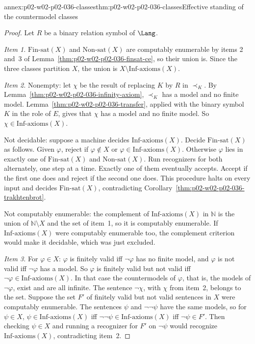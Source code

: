 \begin{annexitem}{annex:p02-w02-p02-036-classes}{thm:p02-w02-p02-036-classes}{Effective standing of the countermodel classes}
\begin{proof}
Let \(R\) be a binary relation symbol of \(\Lang\).

\emph{Item 1.}  \(\mathrm{Fin\text{-}sat}(X)\) and
\(\mathrm{Non\text{-}sat}(X)\) are computably enumerable by items 2 and~3 of
Lemma~\ref{thm:p02-w02-p02-036-finsat-ce}, so their union is.  Since the three
classes partition \(X\), the union is \(X\setminus\mathrm{Inf\text{-}axioms}(X)\).

\emph{Item 2.}  Nonempty: let \(\chi\) be the result of replacing \(K\) by
\(R\) in \(\prec_K\).  By Lemma~\ref{thm:p02-w02-p02-036-infinity-axiom},
\(\prec_K\) has a model and no finite model.  Lemma~\ref{thm:p02-w02-p02-036-transfer},
applied with the binary symbol \(K\) in the role of \(E\), gives that \(\chi\)
has a model and no finite model.  So \(\chi\in\mathrm{Inf\text{-}axioms}(X)\).

Not decidable: suppose a machine decides \(\mathrm{Inf\text{-}axioms}(X)\).
Decide \(\mathrm{Fin\text{-}sat}(X)\) as follows.  Given \(\varphi\), reject if
\(\varphi\notin X\) or \(\varphi\in\mathrm{Inf\text{-}axioms}(X)\).  Otherwise
\(\varphi\) lies in exactly one of \(\mathrm{Fin\text{-}sat}(X)\) and
\(\mathrm{Non\text{-}sat}(X)\).  Run recognizers for both alternately, one step
at a time.  Exactly one of them eventually accepts.  Accept if the first one
does and reject if the second one does.  This procedure halts on every input
and decides \(\mathrm{Fin\text{-}sat}(X)\), contradicting
Corollary~\ref{thm:p02-w02-p02-036-trakhtenbrot}.

Not computably enumerable: the complement of \(\mathrm{Inf\text{-}axioms}(X)\)
in \(\mathbb N\) is the union of \(\mathbb N\setminus X\) and the set of item~1,
so it is computably enumerable.  If \(\mathrm{Inf\text{-}axioms}(X)\) were
computably enumerable too, the complement criterion would make it decidable,
which was just excluded.

\emph{Item 3.}  For \(\varphi\in X\): \(\varphi\) is finitely valid iff
\(\neg\varphi\) has no finite model, and \(\varphi\) is not valid iff
\(\neg\varphi\) has a model.  So \(\varphi\) is finitely valid but not valid
iff \(\neg\varphi\in\mathrm{Inf\text{-}axioms}(X)\).  In that case the
countermodels of \(\varphi\), that is, the models of \(\neg\varphi\), exist and
are all infinite.  The sentence \(\neg\chi\), with \(\chi\) from item~2,
belongs to the set.  Suppose the set \(F'\) of finitely valid but not valid
sentences in \(X\) were computably enumerable.  The sentences \(\psi\) and
\(\neg\neg\psi\) have the same models, so for \(\psi\in X\),
\(\psi\in\mathrm{Inf\text{-}axioms}(X)\) iff
\(\neg\neg\psi\in\mathrm{Inf\text{-}axioms}(X)\) iff \(\neg\psi\in F'\).  Then
checking \(\psi\in X\) and running a recognizer for \(F'\) on \(\neg\psi\) would
recognize \(\mathrm{Inf\text{-}axioms}(X)\), contradicting item~2.
\end{proof}
\end{annexitem}

